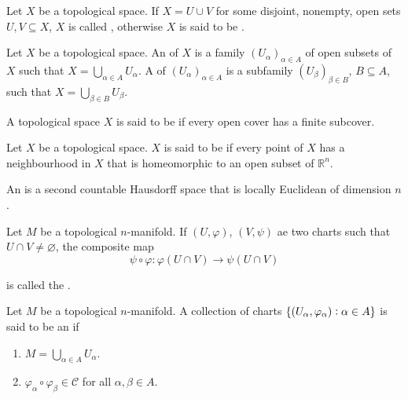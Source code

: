 \begin{definition}
	Let $X$ be a topological space. If $X = U \cup V$ for some disjoint, nonempty, open sets $U,V \subseteq X$, $X$ is called , otherwise $X$ is said to be .
\end{definition}

\begin{definition}
	Let $X$ be a topological space. An  of $X$ is a family $(U_\alpha)_{\alpha \in A}$ of open subsets of $X$ such that $X = \bigcup_{\alpha \in A}U_\alpha$. A  of $(U_\alpha)_{\alpha \in A}$ is a subfamily $(U_\beta)_{\beta \in B}$, $B \subseteq A$, such that $X = \bigcup_{\beta \in B}U_\beta$.	
\end{definition}

\begin{definition}
	A topological space $X$ is said to be  if every open cover has a finite subcover.
\end{definition}

\begin{definition}
	Let $X$ be a topological space. $X$ is said to be  if every point of $X$ has a neighbourhood in $X$ that is homeomorphic to an open subset of $\mathbb{R}^n$.	
\end{definition}

\begin{definition}
	An  is a second countable Hausdorff space that is locally Euclidean of dimension $n$.	
\end{definition}

\begin{definition}
	Let $M$ be a topological $n$-manifold. If $(U,\varphi)$, $(V,\psi)$ ae two charts such that $U \cap V \neq \varnothing$, the composite map
	\begin{equation}
		\psi \circ \varphi: \varphi(U \cap V) \to \psi(U \cap V)
	\end{equation}

	\noindent is called the .  
\end{definition}

\begin{definition}
	Let $M$ be a topological $n$-manifold. A collection of charts $\cbr[0]{(U_\alpha,\varphi_\alpha) : \alpha \in A}$ is said to be an  if 
	\begin{enumerate}
		\item $M = \bigcup_{\alpha \in A} U_\alpha$.
		\item $\varphi_\alpha \circ \varphi_\beta \in \mathscr{C}$ for all $\alpha,\beta \in A$.
	\end{enumerate}
\end{definition}


